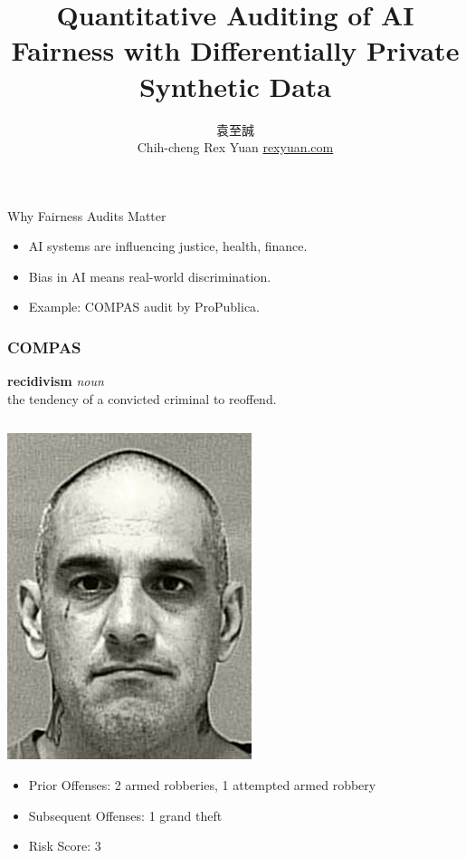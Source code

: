 \documentclass{beamer}
\date{\displaydate{date}}
\title[Fairness]{Quantitative Auditing of AI Fairness with Differentially Private Synthetic Data}
\author[Rex]{
    \begin{CJK}{UTF8}{bsmi}袁至誠\end{CJK}\newline
    Chih-cheng Rex Yuan\newline
    \href{https://rexyuan.com/}{rexyuan.com}
    }
\institute[IIS,AS]{Institute of Information Science, Academia Sinica}
\begin{document}
\begin{frame}
\titlepage
\end{frame}

\begin{frame}{Why Fairness Audits Matter}
  \begin{itemize}
    \item AI systems are influencing justice, health, finance.
    \item Bias in AI means real-world discrimination.
    \item Example: COMPAS audit by ProPublica.
  \end{itemize}
\end{frame}

\begin{frame}
    \frametitle{COMPAS}
    \textbf{recidivism} \textit{noun} \\
    \hspace*{1em} the tendency of a convicted criminal to reoffend.
    \begin{columns}[T]
        \begin{column}{.5\textwidth}
            \centering
            \includegraphics[width=.5\textwidth]{PRATER.jpg}
            \footnotesize
            \begin{itemize}
                \item Prior Offenses: 2 armed robberies, 1 attempted armed robbery
                \item Subsequent Offenses: 1 grand theft
                \item Risk Score: 3
            \end{itemize}
        \end{column}
        \begin{column}{.5\textwidth}

\end{column}
\end{columns}
\end{frame}
\end{document}

